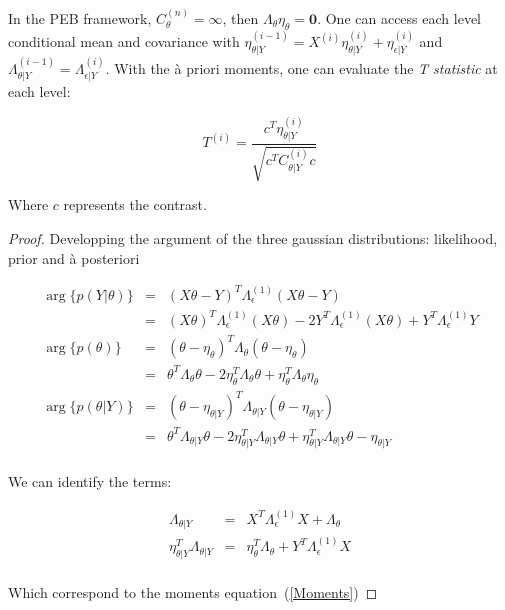 \documentclass[final, paper=letter,5p,times,twocolumn]{elsarticle}
\theoremstyle{definition}
\begin{document}
In the PEB framework, $C_{\theta}^{(n)} = \infty$, then $\Lambda_{\theta}\eta_{\theta} = {\bm 0}$. One can access each level conditional mean and covariance with $\eta_{\theta|Y}^{(i-1)} = X^{(i)}\eta_{\theta|Y}^{(i)} + \eta_{\epsilon|Y}^{(i)}$ and $\Lambda_{\theta|Y}^{(i-1)} = \Lambda_{\epsilon|Y}^{(i)}$. With the \`a priori moments, one can evaluate the {\it T statistic} at each level:

\begin{equation}
  T^{(i)} = \frac{c^{T}\eta_{\theta|Y}^{(i)}}{\sqrt{c^{T}C_{\theta|Y}^{(i)}c}}
  \label{T_stat}
\end{equation}

Where $c$ represents the contrast.

\begin{proof}
Developping the argument of the three gaussian distributions: likelihood, prior and \`a posteriori
  
\begin{equation*}
  \left .
  \begin{array}{rcl}
    \arg\{p(Y|\theta)\} & = & (X\theta - Y)^{T} \Lambda_{\epsilon}^{(1)} (X\theta - Y)  \\
    & = & (X\theta)^{T} \Lambda_{\epsilon}^{(1)}(X\theta) - 2 Y^{T} \Lambda_{\epsilon}^{(1)}(X\theta) + Y^{T} \Lambda_{\epsilon}^{(1)}Y  \\
    \arg\{p(\theta)\}   & = & (\theta - \eta_{\theta})^{T} \Lambda_{\theta} (\theta - \eta_{\theta}) \\
    & = & \theta^{T} \Lambda_{\theta} \theta - 2 \eta_{\theta}^{T}\Lambda_{\theta}\theta + \eta_{\theta}^{T} \Lambda_{\theta} \eta_{\theta}\\
    \arg\{p(\theta|Y)\} & = & (\theta - \eta_{\theta|Y})^{T} \Lambda_{\theta|Y} (\theta - \eta_{\theta|Y}) \\
    & = & \theta^{T} \Lambda_{\theta|Y}\theta - 2 \eta_{\theta|Y}^{T} \Lambda_{\theta|Y}\theta + \eta_{\theta|Y}^{T} \Lambda_{\theta|Y}\theta - \eta_{\theta|Y}\\
  \end{array}
  \right .
\end{equation*}

We can identify the terms:

\begin{equation*}
  \left .
  \begin{array}{rcl}
    \Lambda_{\theta|Y} & = & X^{T}\Lambda_{\epsilon}^{(1)}X + \Lambda_{\theta}\\
    \eta_{\theta|Y}^{T} \Lambda_{\theta|Y} & = & \eta_{\theta}^{T}\Lambda_{\theta} + Y^{T} \Lambda_{\epsilon}^{(1)}X\\
  \end{array}
  \right .
\end{equation*}

Which correspond to the moments equation~(\ref{Moments})
\end{proof}
\end{document}

